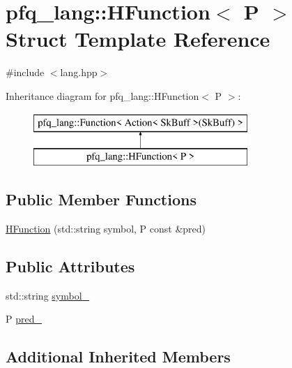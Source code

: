 \hypertarget{structpfq__lang_1_1HFunction}{\section{pfq\+\_\+lang\+:\+:H\+Function$<$ P $>$ Struct Template Reference}
\label{structpfq__lang_1_1HFunction}
}


{\ttfamily \#include $<$lang.\+hpp$>$}

Inheritance diagram for pfq\+\_\+lang\+:\+:H\+Function$<$ P $>$\+:\begin{figure}[H]
\begin{center}
\leavevmode
\includegraphics[height=2.000000cm]{structpfq__lang_1_1HFunction}
\end{center}
\end{figure}
\subsection*{Public Member Functions}
\begin{DoxyCompactItemize}
\item 
\hyperlink{structpfq__lang_1_1HFunction_a4cc9560b79a16c4f6c7c7757bd40480c}{H\+Function} (std\+::string symbol, P const \&pred)
\end{DoxyCompactItemize}
\subsection*{Public Attributes}
\begin{DoxyCompactItemize}
\item 
std\+::string \hyperlink{structpfq__lang_1_1HFunction_aaa57a6f399932d77335276b3861c8e08}{symbol\+\_\+}
\item 
P \hyperlink{structpfq__lang_1_1HFunction_abfe7eeab2caa2997c6abb682bf069b8a}{pred\+\_\+}
\end{DoxyCompactItemize}
\subsection*{Additional Inherited Members}


